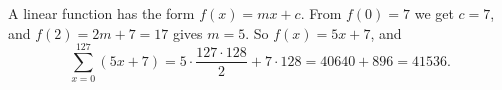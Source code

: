 A linear function has the form $f(x)=mx+c$. From $f(0)=7$ we get $c=7$, and $f(2)=2m+7=17$ gives $m=5$. So $f(x)=5x+7$, and
\[
\sum_{x=0}^{127}(5x+7)=5\cdot\dfrac{127\cdot128}{2}+7\cdot128=40640+896=\boxed{41536}.
\]

